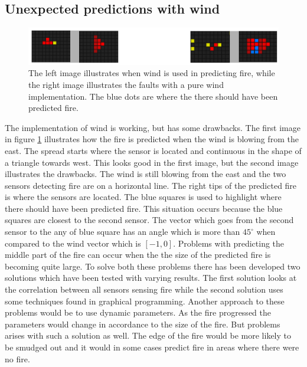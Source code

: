 \subsection{Unexpected predictions with wind}
\label{wind-problem}
\begin{figure}[here]
  \centering
      \includegraphics[width=1.0\textwidth]{solution/graphics/wind-problem.png}
  \caption{The left image illustrates when wind is used in predicting fire, while the right image illustrates the faults with a pure wind implementation. The blue dots are where the there should have been predicted fire.}
  \label{fig:wind-problem}
\end{figure}
The implementation of wind is working, but has some drawbacks. The first image in figure \ref{fig:wind-problem} illustrates how the fire is predicted when the wind is blowing from the east. The spread starts where the sensor is located and continuous in the shape of a triangle towards west. This looks good in the first image, but the second image illustrates the drawbacks. The wind is still blowing from the east and the two sensors detecting fire are on a horizontal line. The right tips of the predicted fire is where the sensors are located. The blue squares is used to highlight where there should have been predicted fire. This situation occurs because the blue squares are closest to the second sensor. The vector which goes from the second sensor to the any of blue square has an angle which is more than $ 45^{\circ} $ when compared to the wind vector which is $ \left[-1,0\right] $. Problems with predicting the middle part of the fire can occur when the the size of the predicted fire is becoming quite large. To solve both these problems there has been developed two solutions which have been tested with varying results. The first solution looks at the correlation between all sensors sensing fire while the second solution uses some techniques found in graphical programming. Another approach to these problems would be to use dynamic parameters. As the fire progressed the parameters would change in accordance to the size of the fire. But problems arises with such a solution as well. The edge of the fire would be more likely to be smudged out and it would in some cases predict fire in areas where there were no fire.
